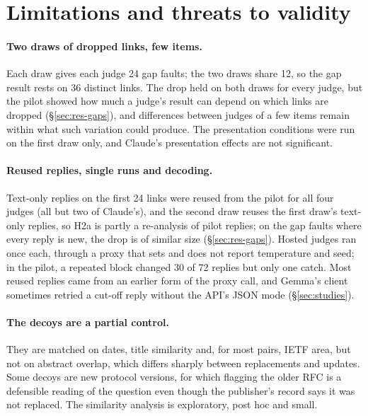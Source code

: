 \section{Limitations and threats to validity}
\label{sec:limitations}

\paragraph{Two draws of dropped links, few items.} Each draw gives each judge 24 gap faults; the two draws share 12,
so the gap result rests on 36 distinct links. The drop held on both draws for every judge, but the pilot showed how much
a judge's result can depend on which links are dropped (\S\ref{sec:res-gaps}), and differences between judges of a few
items remain within what such variation could produce. The presentation conditions were run on the first draw only,
and Claude's presentation effects are not significant.

\paragraph{Reused replies, single runs and decoding.} Text-only replies on the first 24 links were reused from the
pilot for all four judges (all but two of Claude's), and the second draw reuses the first draw's text-only replies, so H2a is partly a
re-analysis of pilot replies; on the gap faults where every reply is new, the drop is of similar size
(\S\ref{sec:res-gaps}). Hosted judges ran once each, through a proxy that sets and does not report temperature and
seed; in the pilot, a repeated block changed 30 of 72 replies but only one catch. Most reused replies came from an
earlier form of the proxy call, and Gemma's client sometimes retried a cut-off reply without the API's JSON mode
(\S\ref{sec:studies}).

\paragraph{The decoys are a partial control.} They are matched on dates, title similarity and, for most pairs, IETF
area, but not on abstract overlap, which differs sharply between replacements and updates. Some decoys are new
protocol versions, for which flagging the older RFC is a defensible reading of the question even though the
publisher's record says it was not replaced. The similarity analysis is exploratory, post hoc and small.


